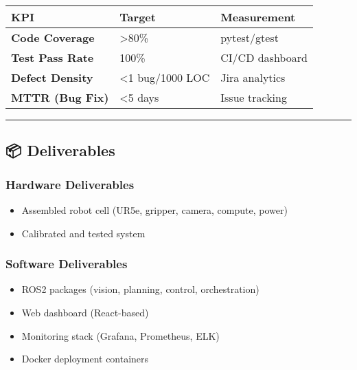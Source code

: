 \documentclass[
]{article}
\providecommand{\tightlist}{%
  \setlength{\itemsep}{0pt}\setlength{\parskip}{0pt}}
\begin{document}
\begin{longtable}[]{@{}lll@{}}
\toprule\noalign{}
\textbf{KPI} & \textbf{Target} & \textbf{Measurement} \\
\midrule\noalign{}
\endhead
\bottomrule\noalign{}
\endlastfoot
\textbf{Code Coverage} & \textgreater80\% & pytest/gtest \\
\textbf{Test Pass Rate} & 100\% & CI/CD dashboard \\
\textbf{Defect Density} & \textless1 bug/1000 LOC & Jira analytics \\
\textbf{MTTR (Bug Fix)} & \textless5 days & Issue tracking \\
\end{longtable}

\begin{center}\rule{0.5\linewidth}{0.5pt}\end{center}

\hypertarget{deliverables}{%
\subsection{📦 Deliverables}\label{deliverables}}

\hypertarget{hardware-deliverables}{%
\subsubsection{Hardware Deliverables}\label{hardware-deliverables}}

\begin{itemize}
\tightlist
\item
  Assembled robot cell (UR5e, gripper, camera, compute, power)
\item
  Calibrated and tested system
\end{itemize}

\hypertarget{software-deliverables}{%
\subsubsection{Software Deliverables}\label{software-deliverables}}

\begin{itemize}
\tightlist
\item
  ROS2 packages (vision, planning, control, orchestration)
\item
  Web dashboard (React-based)
\item
  Monitoring stack (Grafana, Prometheus, ELK)
\item
  Docker deployment containers
\end{itemize}
\end{document}

